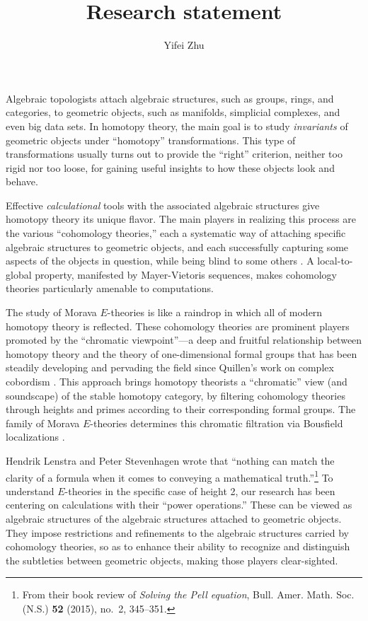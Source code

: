 \documentclass{rs}
\title{Research statement}
\author{Yifei Zhu}
\theoremstyle{definition}
\theoremstyle{remark}
\renewcommand{\=}{\approx}
\renewcommand{\-}{\sim}
\numberwithin{equation}{section}
\begin{document}
\maketitle

Algebraic topologists attach algebraic structures, such as groups, rings, and 
categories, to geometric objects, such as manifolds, simplicial complexes, and 
even big data sets.  In homotopy theory, the main goal is to study 
{\em invariants} of geometric objects under ``homotopy'' transformations.  This 
type of transformations usually turns out to provide the ``right'' criterion, 
neither too rigid nor too loose, for gaining useful insights to how these 
objects look and behave.  

Effective {\em calculational} tools with the associated algebraic structures 
give homotopy theory its unique flavor.  The main players in realizing this 
process are the various ``cohomology theories,'' each a systematic way of 
attaching specific algebraic structures to geometric objects, and each 
successfully capturing some aspects of the objects in question, while being 
blind to some others \cite{blind}.  A local-to-global property, manifested by 
Mayer-Vietoris sequences, makes cohomology theories particularly amenable to 
computations.  

The study of Morava $E$-theories is like a raindrop in which all of modern 
homotopy theory is reflected.  These cohomology theories are prominent players 
promoted by the ``chromatic viewpoint''---a deep and fruitful relationship 
between homotopy theory and the theory of one-dimensional formal groups that has 
been steadily developing and pervading the field since Quillen's work on complex 
cobordism \cite{Quillen}.  This approach brings homotopy theorists a 
``chromatic'' view (and soundscape) of the stable homotopy category, by 
filtering cohomology theories through heights and primes according to their 
corresponding formal groups.  The family of Morava $E$-theories determines this 
chromatic filtration via Bousfield localizations \cite{Ravenel}.  

Hendrik Lenstra and Peter Stevenhagen wrote that ``nothing can match the clarity 
of a formula when it comes to conveying a mathematical truth.''\footnote{From 
their book review of {\em Solving the Pell equation}, Bull. Amer. Math. Soc. 
(N.S.) \textbf{52} (2015), no.~2, 345--351.}  To understand $E$-theories in the 
specific case of height 2, our research has been centering on calculations with 
their ``power operations.''  These can be viewed as algebraic structures of the 
algebraic structures attached to geometric objects.  They impose restrictions 
and refinements to the algebraic structures carried by cohomology theories, so 
as to enhance their ability to recognize and distinguish the subtleties between 
geometric objects, making those players clear-sighted.  
\end{document}
